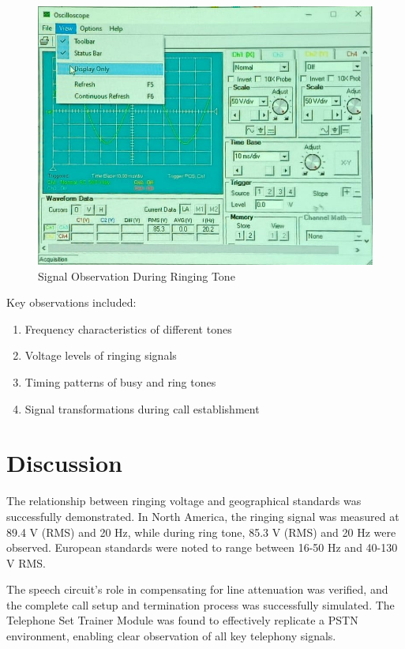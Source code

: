 \documentclass[a4paper,12pt]{article}
\begin{document}
	\begin{figure}[H]
		\centering
	\includegraphics[width=0.68\linewidth]{Images/4}
		\caption{Signal Observation During Ringing Tone}
		\label{fig:ring}
	\end{figure}
	
	Key observations included:
	\begin{enumerate}
		\item Frequency characteristics of different tones
		\item Voltage levels of ringing signals
		\item Timing patterns of busy and ring tones
		\item Signal transformations during call establishment
	\end{enumerate}
	

	\section{Discussion}
	
	The relationship between ringing voltage and geographical standards was successfully demonstrated. In North America, the ringing signal was measured at 89.4 V (RMS) and 20 Hz, while during ring tone, 85.3 V (RMS) and 20 Hz were observed. European standards were noted to range between 16-50 Hz and 40-130 V RMS.
	
	The speech circuit's role in compensating for line attenuation was verified, and the complete call setup and termination process was successfully simulated. The Telephone Set Trainer Module was found to effectively replicate a PSTN environment, enabling clear observation of all key telephony signals.
	
	

	
\end{document}
